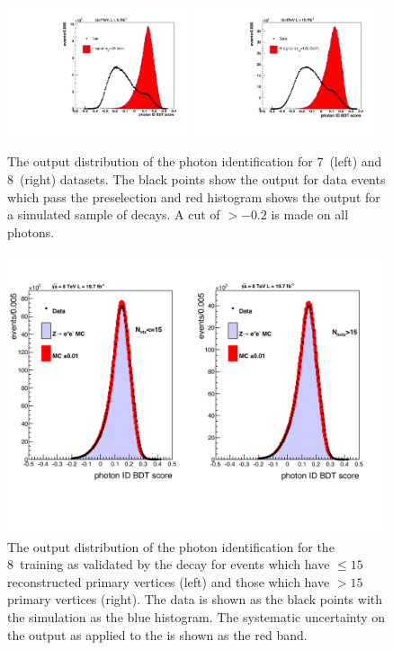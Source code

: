 \begin{figure}
  \includegraphics[width=0.48\textwidth]{selec_and_cats/plots/lowScoreID_7TeV.pdf}
  \includegraphics[width=0.48\textwidth]{selec_and_cats/plots/lowScoreID_8TeV.pdf}
  \caption[The output distribution of the photon identification \BDT]{The output distribution of the photon identification \BDT for 7~\TeV (left) and 8~\TeV (right) datasets. The black points show the output for data events which pass the preselection and red histogram shows the output for a simulated \MC sample of \Hgg decays. A cut of $>-0.2$ is made on all photons.}
  \label{fig:photon_id_bdt}
\end{figure}

\begin{figure}
  \includegraphics[width=0.98\textwidth]{selec_and_cats/plots/idmva_nvtx.pdf}
  \caption[The output distribution of the photon identification \BDT in \Zee decays]{The output distribution of the photon identification \BDT for the 8~\TeV training as validated by the \Zee decay for events which have $\leq15$ reconstructed primary vertices (left) and those which have $>15$ primary vertices (right). The data is shown as the black points with the \MC simulation as the blue histogram. The systematic uncertainty on the output as applied to the \MC is shown as the red band.}
  \label{fig:photon_id_zee}
\end{figure}

